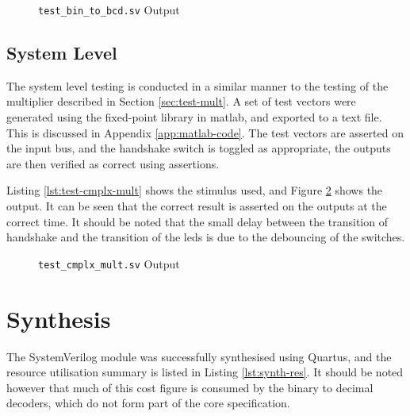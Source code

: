 
\begin{figure}[ht]
	\centering
	
	\caption{\texttt{test\_bin\_to\_bcd.sv} Output}
	\label{fig:test-bin-to-bcd}
\end{figure}

\FloatBarrier
\subsection{System Level}
The system level testing is conducted in a similar manner to the testing of the multiplier described in Section \ref{sec:test-mult}. A set of test vectors were generated using the fixed-point library in \gls{matlab}, and exported to a text file. This is discussed in Appendix \ref{app:matlab-code}. The test vectors are asserted on the input bus, and the handshake switch is toggled as appropriate, the outputs are then verified as correct using assertions.

Listing \ref{lst:test-cmplx-mult} shows the stimulus used, and Figure \ref{fig:test-cmplx-mult} shows the output. It can be seen that the correct result is asserted on the outputs at the correct time. It should be noted that the small delay between the transition of handshake and the transition of the \glspl{led} is due to the debouncing of the switches.


\begin{figure}[ht]
	\centering
	
	\caption{\texttt{test\_cmplx\_mult.sv} Output}
	\label{fig:test-cmplx-mult}
\end{figure}

\FloatBarrier
\section{Synthesis}  \label{sec:synth}
The SystemVerilog module was successfully synthesised using Quartus, and the resource utilisation summary is listed in Listing \ref{lst:synth-res}. It should be noted however that much of this cost figure is consumed by the binary to decimal decoders, which do not form part of the core specification.



